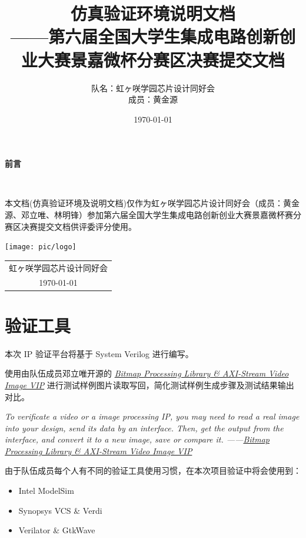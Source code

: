 \documentclass[12pt, a4paper, oneside]{ctexbook}
\title{{\Huge{\textbf{仿真验证环境说明文档}}}\normalsize{\\——第六届全国大学生集成电路创新创业大赛景嘉微杯分赛区决赛提交文档}}
\author{队名：虹ヶ咲学园芯片设计同好会\\ 成员：黄金源\space邓立唯\space林明锋}
\date{\today}
\begin{document}
	
	\maketitle	
	\setcounter{page}{1}
	\begin{center}
		\Huge\textbf{前言}
	\end{center}~\
	
	本文档(仿真验证环境及说明文档)仅作为虹ヶ咲学园芯片设计同好会（成员：黄金源、邓立唯、林明锋）参加第六届全国大学生集成电路创新创业大赛景嘉微杯赛分赛区决赛提交文档供评委评分使用。
	~\\
	\begin{flushright}
		\texttt{[image: pic/logo]}\\
		\begin{tabular}{c}
			虹ヶ咲学园芯片设计同好会\\
			\today
		\end{tabular}
	\end{flushright}
	\newpage
	\setcounter{page}{1}
	\tableofcontents
	\newpage
	\setcounter{page}{1}
	
	\chapter{验证工具}
	本次 IP 验证平台将基于 System Verilog 进行编写。\par 使用由队伍成员邓立唯开源的 \href{https://github.com/Aperture-Electronic/SystemVerilog-Bitmap-Library-AXI-Image-VIP}{\textit{Bitmap Processing Library \& AXI-Stream Video Image VIP}} 进行测试样例图片读取写回，简化测试样例生成步骤及测试结果输出对比。\par \par
	\emph{To verificate a video or a image processing IP, you may need to read a real image into your design, send its data by an interface. Then, get the output from the interface, and convert it to a new image, save or compare it. ——\href{https://github.com/Aperture-Electronic/SystemVerilog-Bitmap-Library-AXI-Image-VIP}{Bitmap Processing Library \& AXI-Stream Video Image VIP}} \\
	
	\par \par 由于队伍成员每个人有不同的验证工具使用习惯，在本次项目验证中将会使用到：
	\begin{itemize}
		\item Intel ModelSim
		\item Synopsys VCS \& Verdi
		\item Verilator \& GtkWave
	\end{itemize}
\end{document}
